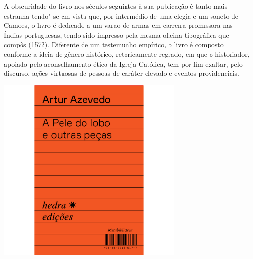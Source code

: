 A obscuridade do livro nos séculos seguintes à sua publicação é tanto mais estranha tendo"-se em vista que, por intermédio de uma elegia e um soneto de Camões, o livro é dedicado a um varão de armas em carreira promissora nas Índias portuguesas, tendo sido impresso pela mesma oficina tipográfica que compôs {} (1572). Diferente de um testemunho empírico, o livro é composto conforme a ideia de gênero histórico, retoricamente regrado, em que o historiador, apoiado pelo aconselhamento ético da Igreja Católica, tem por fim exaltar, pelo discurso, ações virtuosas de pessoas de caráter elevado e eventos providenciais.

\vfill

\hspace*{-.4cm}\begin{minipage}[c]{.5\linewidth}
\small{
{}}
\end{minipage}

\pagebreak

\hspace{.5cm}

\begin{center}
\hspace*{.5cm}\includegraphics[width=92mm]{./grid/azevedo.jpg}
\end{center}

